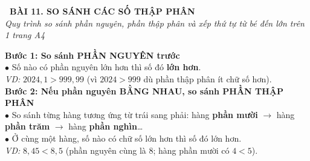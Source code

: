 \documentclass[14pt,a4paper,oneside]{extbook}
\begin{document}
\noindent
\begin{tcolorbox}[
  enhanced,
  colback=teal!8!white,
  colframe=teal!80!black,
  arc=3mm,
  boxrule=1.1pt,
  width=\linewidth,
  halign=center,
  top=2.2mm, bottom=2.2mm,
  left=3mm, right=3mm,
  drop fuzzy shadow
]
  {\large\bfseries\color{teal!95!black}\faBookmark\ BÀI 11. SO SÁNH CÁC SỐ THẬP PHÂN}\\[2pt]
  {\scriptsize\color{black!75}\itshape Quy trình so sánh phần nguyên, phần thập phân và xếp thứ tự từ bé đến lớn trên 1 trang A4}
\end{tcolorbox}

\vspace{3.2mm}
\noindent
\begin{tcolorbox}[
  enhanced,
  title={\footnotesize\bfseries\color{white}\faBalanceScale\ 1. Quy tắc so sánh hai số thập phân},
  colback=blue!2!white,
  colframe=blue!75!black,
  arc=2.5mm, boxrule=0.8pt, top=1.8mm, bottom=1.8mm, left=2.5mm, right=2.5mm
]
  \footnotesize
  \textbf{Bước 1: So sánh PHẦN NGUYÊN trước}\\
  $\bullet$ Số nào có phần nguyên lớn hơn thì số đó \textbf{lớn hơn}.\\
  \textit{VD:} $2024,1 > 999,99$ (vì $2024 > 999$ dù phần thập phân ít chữ số hơn).\\[2pt]
  \textbf{Bước 2: Nếu phần nguyên BẰNG NHAU, so sánh PHẦN THẬP PHÂN}\\
  $\bullet$ So sánh từng hàng tương ứng từ trái sang phải: hàng \textbf{phần mười} $\rightarrow$ hàng \textbf{phần trăm} $\rightarrow$ hàng \textbf{phần nghìn}\dots\\
  $\bullet$ Ở cùng một hàng, số nào có chữ số lớn hơn thì số đó lớn hơn.\\
  \textit{VD:} $8,45 < 8,5$ (phần nguyên cùng là $8$; hàng phần mười có $4 < 5$).
\end{tcolorbox}

\vspace{3mm}
\end{document}
